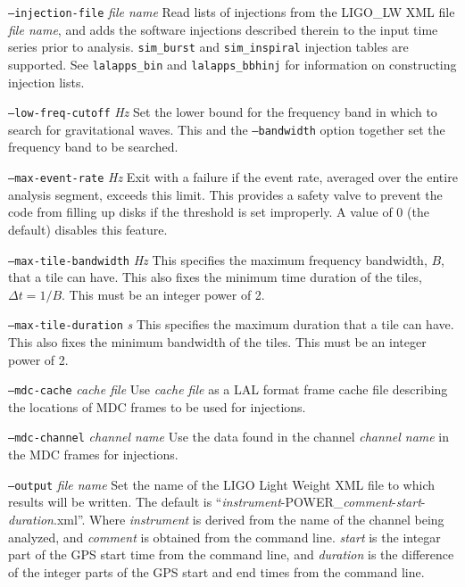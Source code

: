 \documentclass[10pt]{article}
\newcommand{\prog}[1]{\texttt{#1}}
\newcommand{\option}[1]{\texttt{#1}}
\newcommand{\parm}[1]{\textit{#1}}
\newenvironment{entry}%
{\begin{list}{}{\renewcommand{\makelabel}[1]%
{\parbox[b]{\labelwidth}{\makebox[0pt][l]{\textbf{##1}}\\}}%
\setlength{\labelwidth}{1em}%
\setlength{\labelsep}{1em}%
\setlength{\leftmargin}{2em}%
\setlength{\topsep}{\medskipamount}%
\setlength{\itemsep}{\medskipamount}%
\setlength{\parsep}{\medskipamount}%
\setlength{\listparindent}{0pt}}}
{\end{list}}
\begin{document}
\begin{entry}
\begin{entry}
\item[\option{--injection-file} \parm{file name}]
Read lists of injections from the LIGO\_LW XML file \parm{file name}, and
adds the software injections described therein to the input time series
prior to analysis.  \verb+sim_burst+ and \verb+sim_inspiral+ injection
tables are supported.  See \prog{lalapps\_bin} and \prog{lalapps\_bbhinj}
for information on constructing injection lists.

\item[\option{--low-freq-cutoff} \parm{Hz}]
Set the lower bound for the frequency band in which to search for
gravitational waves.  This and the \option{--bandwidth} option together set
the frequency band to be searched.

\item[\option{--max-event-rate} \parm{Hz}]
Exit with a failure if the event rate, averaged over the entire analysis
segment, exceeds this limit.  This provides a safety valve to prevent the
code from filling up disks if the threshold is set improperly.  A value of
0 (the default) disables this feature.

\item[\option{--max-tile-bandwidth} \parm{Hz}]
This specifies the maximum frequency bandwidth, \(B\), that a tile can
have.  This also fixes the minimum time duration of the tiles, \(\Delta t =
1/B\).  This must be an integer power of 2.

\item[\option{--max-tile-duration} \parm{s}]
This specifies the maximum duration that a tile can have.  This also fixes
the minimum bandwidth of the tiles.  This must be an integer power of 2.

\item[\option{--mdc-cache} \parm{cache file}]
Use \parm{cache file} as a LAL format frame cache file describing the
locations of MDC frames to be used for injections.

\item[\option{--mdc-channel} \parm{channel name}]
Use the data found in the channel \parm{channel name} in the MDC frames for
injections.

\item[\option{--output} \parm{file name}]
Set the name of the LIGO Light Weight XML file to which results will be
written.  The default is
``\parm{instrument}-POWER\_\parm{comment}-\parm{start}-\parm{duration}.xml''.
Where \parm{instrument} is derived from the name of the channel being
analyzed, and \parm{comment} is obtained from the command line.
\parm{start} is the integar part of the GPS start time from the command
line, and \parm{duration} is the difference of the integer parts of the
GPS start and end times from the command line.


\end{entry}
\end{entry}
\end{document}
